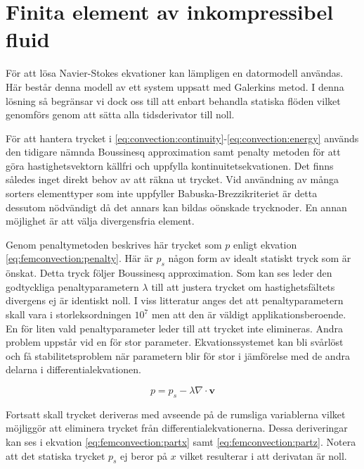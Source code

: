 \section{Finita element av inkompressibel fluid}
\label{sec:femconvection}
För att lösa Navier-Stokes ekvationer kan lämpligen en datormodell användas.
Här består denna modell av ett system uppsatt med Galerkins metod.
I denna lösning så begränsar vi dock oss till att enbart behandla statiska flöden
vilket genomförs genom att sätta alla tidsderivator till noll.

För att hantera trycket i \eqref{eq:convection:continuity}-\eqref{eq:convection:energy} används den tidigare nämnda Boussinesq approximation
samt penalty metoden för att göra hastighetsvektorn källfri och uppfylla
kontinuitetsekvationen. Det finns således inget direkt behov av att räkna ut trycket.
Vid användning av många sorters elementtyper som inte uppfyller Babuska-Brezzikriteriet
är detta dessutom nödvändigt då det annars kan bildas oönskade trycknoder. 
En annan möjlighet är att välja divergensfria element. \cite{babuska1973}\cite{segal2011}

Genom penaltymetoden beskrives här trycket som $p$ enligt ekvation
\eqref{eq:femconvection:penalty}. Här är $p_s$ någon form av idealt statiskt
tryck som är önskat. Detta tryck följer Boussinesq approximation.
\cite{heinrich88}\cite{taylor79}
Som kan ses leder den godtyckliga penaltyparametern $\lambda$ till att justera trycket
om hastighetsfältets divergens ej är identiskt noll. I viss litteratur anges 
det att penaltyparametern skall vara i storleksordningen $10^7$ men att den
är väldigt applikationsberoende. En för liten vald penaltyparameter leder till att
trycket inte elimineras. Andra problem uppstår vid en för stor parameter. Ekvationssystemet
kan bli svårlöst och få stabilitetsproblem när parametern blir
för stor i jämförelse med de andra delarna i differentialekvationen.\cite{reddy93}\cite{roy05}\cite{basak04}\cite{segal2011}

\begin{equation}
\label{eq:femconvection:penalty}
p = p_s - \lambda\nabla\cdot\mathbf{v}
\end{equation}

\noindent
Fortsatt skall trycket deriveras med avseende på de rumsliga variablerna vilket möjliggör
att eliminera trycket från differentialekvationerna. Dessa deriveringar kan ses i ekvation
\eqref{eq:femconvection:partx} samt \eqref{eq:femconvection:partz}.
Notera att det statiska trycket
$p_s$ ej beror på $x$ vilket resulterar i att derivatan är noll.

